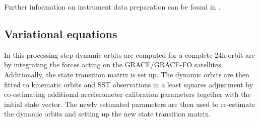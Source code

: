 Further information on instrument data preparation can be found in
.

\subsection{Variational equations}\label{cookbook.gravityFieldGrace:variational}
In this processing step dynamic orbits are computed for a complete 24h orbit arc by integrating
the forces acting on the GRACE/GRACE-FO satellites. Additionally, the state transition matrix is set up.
The dynamic orbits are then fitted to kinematic orbits and SST observations in a least squares adjustment
by co-estimating additional accelerometer calibration parameters together with the initial state vector.
The newly estimated parameters are then used to re-estimate the dynamic orbits and setting up the new
state transition matrix.

